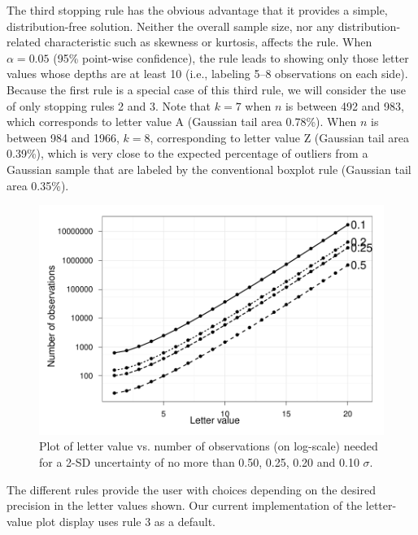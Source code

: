 \documentclass[12pt,oneside]{article}
\begin{document}
\noindent The third stopping rule has the obvious advantage that it provides a simple, distribution-free solution. Neither the overall sample size, nor any distribution-related characteristic such as skewness or kurtosis, affects the rule. When $\alpha = 0.05$ (95\% point-wise confidence), the rule leads to showing only those letter values whose depths are at least 10 (i.e., labeling 5--8 observations on each side). Because the first rule is a special case of this third rule, we will consider the use of only stopping rules 2 and 3. Note that $k = 7$ when $n$ is between 492 and 983, which corresponds to letter value A (Gaussian tail area 0.78\%). When $n$ is between 984 and 1966, $k = 8$, corresponding to letter value Z (Gaussian tail area 0.39\%), which is very close to the expected percentage of outliers from a Gaussian sample that are labeled by the conventional boxplot rule (Gaussian tail area 0.35\%).



\begin{figure}[hbtp]
  \centering
  \includegraphics[width=0.5\linewidth]{letter-val-errors}

  \caption{Plot of letter value vs. number of observations (on log-scale) needed for a 2-SD uncertainty of no more than 0.50, 0.25, 0.20 and 0.10 $\sigma$. }
  \label{fig:lv-error} 
\end{figure}

The different rules provide the user with choices depending on the desired precision in the letter values shown. Our current implementation of the letter-value plot display uses rule 3 as a default.
\end{document}
